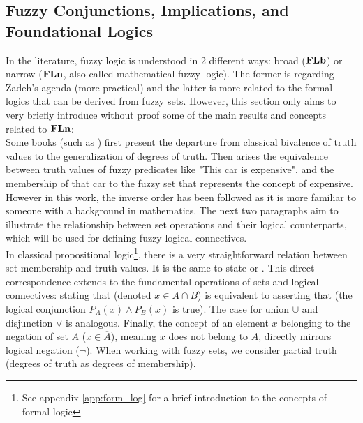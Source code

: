 
\subsection{Fuzzy Conjunctions, Implications, and Foundational Logics}

In the literature\cite{HistoryFL2017}, fuzzy logic is understood in 2 different ways: broad ($\mathbf{FLb}$) or narrow ($\mathbf{FLn}$, also called mathematical fuzzy logic). The former is regarding Zadeh's agenda (more practical) and the latter is more related to the formal logics that can be derived from fuzzy sets. However, this section only aims to very briefly introduce without proof some of the main results and concepts related to $\mathbf{FLn}$: \\

Some books (such as \cite{HistoryFL2017}) first present the departure from classical bivalence of truth values to the generalization of degrees of truth. Then arises the equivalence between truth values of fuzzy predicates like "This car is expensive", and the membership of that car to the fuzzy set that represents the concept of expensive. However in this work, the inverse order has been followed as it is more familiar to someone with a background in mathematics. The next two paragraphs aim to illustrate the relationship between set operations and their logical counterparts, which will be used for defining fuzzy logical connectives.\\


In classical propositional logic\footnote{See appendix \ref{app:form_log} for a brief introduction to the concepts of formal logic}, there is a very straightforward relation between set-membership and truth values. It is the same to state  or . This direct correspondence extends to the fundamental operations of sets and logical connectives: stating that  (denoted $x \in A \cap B$) is equivalent to asserting that  (the logical conjunction $P_A(x) \land P_B(x)$ is true). The case for union $\cup$ and disjunction $\lor$ is analogous. Finally, the concept of an element $x$ belonging to the negation of set $A$ ($x \in \overline{A}$), meaning $x$ does not belong to $A$, directly mirrors logical negation ($\neg$). When working with fuzzy sets, we consider partial truth (degrees of truth as degrees of membership).\\

